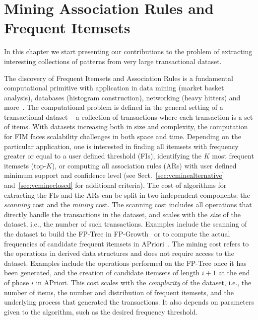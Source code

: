 \chapter[Mining Association Rules and Frequent Itemsets]{Mining Association
Rules and Frequent Itemsets\protect{}}\label{ch:vcmine}

In this chapter we start presenting our contributions to the problem of
extracting interesting collections of patterns from very large transactional
dataset.

The discovery of Frequent Itemsets and Association Rules is a fundamental
computational primitive with application in data mining (market basket
analysis), databases (histogram construction), networking (heavy hitters) and
more~\cite[Sect.~5]{HanCXY07}. 
The computational problem is defined in the general setting of a transactional
dataset -- a collection of transactions where each transaction is a set of
items.  With datasets increasing both in size and complexity, the computation
for FIM faces scalability challenges in both space and time. Depending on the
particular application, one is interested in finding all itemsets with frequency
greater or equal to a user defined threshold (FIs), identifying the $K$ most
frequent itemsets (top-$K$), or computing all association rules (ARs) with user
defined minimum  support and
confidence level (see Sect.~\ref{sec:vcminealternative} and~\ref{sec:vcmineclosed} for additional criteria). 
The cost of algorithms for extracting the FIs and the ARs can be split in two independent components:
the \emph{scanning} cost and the \emph{mining} cost. The scanning cost includes
all operations that directly handle the transactions in the dataset, and scales
with the \emph{size} of the dataset, i.e., the number of such transactions. Examples
include the scanning of the dataset to build the FP-Tree in
FP-Growth~\citep{HanPY00} or to compute the actual frequencies of candidate
frequent itemsets in APriori~\citep{AgrawalIS93}.  The mining cost refers to the
operations in derived data structures and does not require access to the
dataset. Examples include the operations performed on the FP-Tree once it has
been generated, and the creation of candidate itemsets of length $i+1$ at the
end of phase $i$ in APriori.  This cost scales with the \emph{complexity} of the
dataset, i.e., the number of items, the number and distribution of frequent
itemsets, and the underlying process that generated the transactions. It also
depends on parameters given to the algorithm, such as the desired frequency
threshold.

